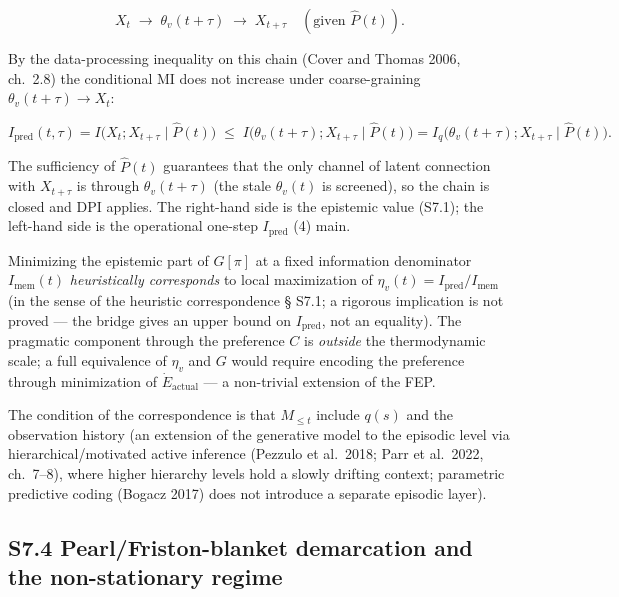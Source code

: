 \documentclass[pdflatex,sn-mathphys-ay]{sn-jnl}
\begin{document}
\[X_t \;\to\; \theta_v(t+\tau) \;\to\; X_{t+\tau} \quad (\text{given } \hat P(t)).\]



By the data-processing inequality on this chain (Cover and Thomas 2006, ch.~2.8) the conditional MI does not increase under coarse-graining \(\theta_v(t+\tau) \to X_t\):



\[I_{\text{pred}}(t,\tau) = I\bigl(X_t; X_{t+\tau}\mid\hat P(t)\bigr) \;\le\; I\bigl(\theta_v(t+\tau); X_{t+\tau}\mid\hat P(t)\bigr) = I_q\bigl(\theta_v(t+\tau); X_{t+\tau} \mid \hat P(t)\bigr).\]



The sufficiency of \(\hat P(t)\) guarantees that the only channel of latent connection with \(X_{t+\tau}\) is through \(\theta_v(t+\tau)\) (the stale \(\theta_v(t)\) is screened), so the chain is closed and DPI applies. The right-hand side is the epistemic value (S7.1); the left-hand side is the operational one-step \(I_{\text{pred}}\) (4) main.



Minimizing the epistemic part of \(G[\pi]\) at a fixed information denominator \(I_{\text{mem}}(t)\) \emph{heuristically corresponds} to local maximization of \(\eta_v(t) = I_{\text{pred}}/I_{\text{mem}}\) (in the sense of the heuristic correspondence § S7.1; a rigorous implication is not proved --- the bridge gives an upper bound on \(I_{\text{pred}}\), not an equality). The pragmatic component through the preference \(C\) is \emph{outside} the thermodynamic scale; a full equivalence of \(\eta_v\) and \(G\) would require encoding the preference through minimization of \(\dot{E}_{\text{actual}}\) --- a non-trivial extension of the FEP.



The condition of the correspondence is that \(M_{\le t}\) include \(q(s)\) and the observation history (an extension of the generative model to the episodic level via hierarchical/motivated active inference (Pezzulo et al.~2018; Parr et al.~2022, ch.~7--8), where higher hierarchy levels hold a slowly drifting context; parametric predictive coding (Bogacz 2017) does not introduce a separate episodic layer).



\subsection*{S7.4 Pearl/Friston-blanket demarcation and the non-stationary regime}\label{s7.4-pearlfriston-blanket-demarcation-and-the-non-stationary-regime}
\end{document}
